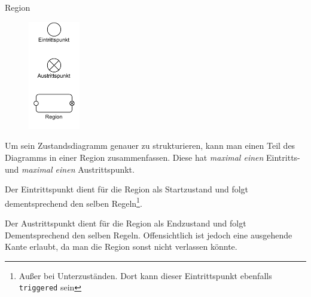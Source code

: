 \begin{defi}{Region}
    \begin{figure}
        \centering
        \includegraphics[width=0.2\textwidth]{includes/figures/defi_diagrams_state_region.pdf}
    \end{figure}
    Um sein Zustandsdiagramm genauer zu strukturieren, kann man einen Teil des Diagramms in einer Region zusammenfassen.
    Diese hat \emph{maximal einen} Eintritts- und \emph{maximal einen} Austrittspunkt.

    Der Eintrittspunkt dient für die Region als Startzustand und folgt dementsprechend den selben Regeln\footnote{
        Außer bei Unterzuständen.
        Dort kann dieser Eintrittspunkt ebenfalls \texttt{triggered} sein
    }.

    Der Austrittspunkt dient für die Region als Endzustand und folgt Dementsprechend den selben Regeln.
    Offensichtlich ist jedoch eine ausgehende Kante erlaubt, da man die Region sonst nicht verlassen könnte.

    \vspace{1.5cm}
\end{defi}

